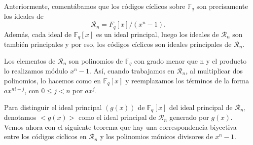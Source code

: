 Anteriormente, comentábamos que los códigos cíclicos sobre $\mathbb{F}_q$ son precisamente los ideales de 
\[
\mathcal{R}_n = F_q[x]/(x^n-1).
\]
Además, cada ideal de $\mathbb{F}_q[x]$ es un ideal principal, luego los ideales de $\mathcal{R}_n$ son también principales y por eso, los códigos cíclicos son ideales principales de $\mathcal{R}_n$.

Los elementos de $\mathcal{R}_n$ son polinomios de $\mathbb{F}_q$ con grado menor que n y el producto lo realizamos módulo $x^n-1$. Así, cuando trabajamos en $\mathcal{R}_n$, al multiplicar dos polinomios,  lo hacemos como en $\mathbb{F}_q[x]$ y reemplazamos los términos de la forma $ax^{ni+j}$, con $ 0 \leq j < n$ por $ax^j$.

Para distinguir el ideal principal $(g(x))$ de $\mathbb{F}_q[x]$ del ideal principal de $\mathcal{R}_n$, denotamos $<g(x)>$ como el ideal principal de $\mathcal{R}_n$ generado por $g(x)$. Vemos ahora con el siguiente teorema que hay una correspondencia biyectiva entre los códigos cíclicos en $\mathcal{R}_n$ y los polinomios mónicos divisores de $x^n-1$.


